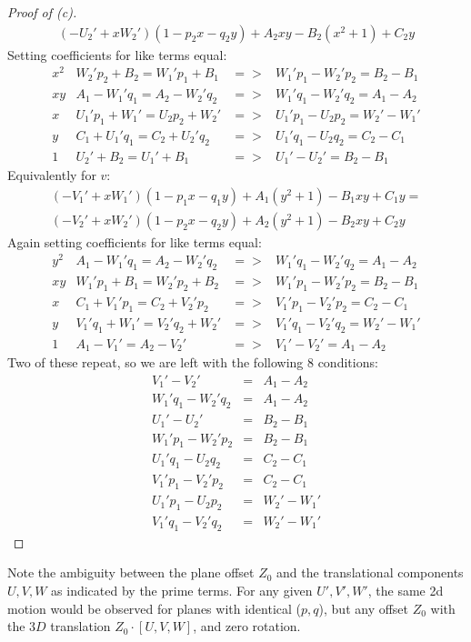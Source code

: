 \documentclass[letter,11pt]{article}
\begin{document}
{\begin{proof}[Proof of (c)]
\begin{equation*}
\begin{split}
	 (-U_2'+xW_2')(1-p_2x-q_2y) + A_2xy - B_2(x^2+1) + C_2y 
\end{split}
\end{equation*}
Setting coefficients for like terms equal:
$$\begin{array}{llcl}
	x^2 & W_2' p_{2} + B_{2} =  W_1' p_{1} + B_{1}  &=> &   W_1'p_1-W_2'p_2=B_2-B_1 \\
	xy  & A_{1} - W_1' q_{1} = A_{2} - W_2' q_{2}   &=> &   W_1'q_1-W_2'q_2=A_1-A_2 \\
	x   & U_1' p_{1} + W_1' = U_{2} p_{2} + W_2'   &=> &   U_1'p_1-U_2p_2=W_2'-W_1' \\
	y   & C_{1} + U_1' q_{1} = C_{2} + U_{2}' q_{2}  & => &   U_1'q_1-U_2q_2=C_2-C_1 \\
	1   & U_2' + B_{2} = U_1' + B_{1}               & => &   U_1' - U_2' = B_2-B_1 
\end{array}
$$
Equivalently for $v$:
\begin{equation*}
	\begin{split}
		(-V_1'+xW_1')(1-p_1x-q_1y) + A_1(y^2+1) - B_1xy + C_1y = \\
		(-V_2'+xW_2')(1-p_2x-q_2y) + A_2(y^2+1) - B_2xy + C_2y 
	\end{split}
\end{equation*}
Again setting coefficients for like terms equal:
$$\begin{array}{llcl}
	y^2 & A_{1} - W_{1}' q_{1} = A_{2} - W_{2}' q_{2}  &=> & W_1'q_1 - W_2'q_2 = A_1-A_2 \\ 
	xy  &  W_{1}' p_{1} + B_{1} = W_{2}' p_{2} + B_{2}   &=> & W_1'p_1 - W_2'p_2 = B_2-B_1 \\
	x   &  C_{1} + V_{1}' p_{1} =  C_{2} + V_{2}' p_{2}   &=> & V_1'p_1 - V_2'p_2 = C_2-C_1 \\
	y   & V_{1}' q_{1} + W_{1}' = V_{2}' q_{2} + W_{2}'  & => & V_1'q_1 - V_2'q_2 = W_2'-W_1' \\ 
	1   & A_{1} - V_{1}' = A_{2} - V_{2}'               & => &   V_1' - V_2' = A_1-A_2 
\end{array}
$$
Two of these repeat, so we are left with the following 8 conditions:
\begin{eqnarray*}
	V_1' - V_2' &=& A_1-A_2\\
	W_1'q_1 - W_2'q_2 &=& A_1-A_2 \\
	U_1' - U_2' &=& B_2-B_1 \\
	W_1'p_1 - W_2'p_2 &=& B_2-B_1 \\ 
	U_1'q_1-U_2q_2 &=& C_2-C_1 \\
	V_1'p_1 - V_2'p_2 &=& C_2-C_1 \\
	U_1'p_1-U_2p_2 &=& W_2'-W_1' \\
	V_1'q_1 - V_2'q_2 &=& W_2'-W_1'
\end{eqnarray*}
\end{proof}
Note the ambiguity between the plane offset $Z_0$ and the translational components $U,V,W$ as 
indicated by the prime terms.  For any given $U',V',W'$, the same 2d motion would be observed for planes with identical ($p,q$), but any offset $Z_0$ with the $3D$ translation $Z_0\cdot[U,V,W]$, and zero rotation.

}
\end{document}
